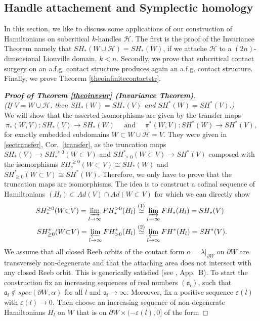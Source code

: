 \documentclass[a4paper,12pt,bibliography=totocnumbered,titlepage=false,abstracton,bookmarksnumbered=true]{scrartcl}
\newcommand{\veps}{\varepsilon}
\theoremstyle{definition}
\begin{document}
\subsection{Handle attachement and Symplectic homology}
In this section, we like to discuss some applications of our construction of Hamiltonians on subcritical $k$-handles $\mathcal{H}$. The first is the proof of the Invariance Theorem namely that $SH_\ast(W{\cup}\mathcal{H})=SH_\ast(W)$, if we attache $\mathcal{H}$ to a $(2n)$-dimensional Liouville domain, $k<n$. Secondly, we prove that subcritical contact surgery on an a.f.g. contact structure produces again an a.f.g. contact structure. Finally, we prove Theorem \ref{theoinfinitecontactstr}.
\begin{proof}[\textnormal{\textbf{Proof of Theorem \ref{theoinvsur} (Invariance Theorem)}}]~\\
\textit{(If $V=W{\cup}\mathcal{H}$, then $SH_\ast(W)=SH_\ast(V)$ and $SH^\ast(W)=SH^\ast(V)$.)}\bigskip\\
We will show that the asserted isomorphisms are given  by the transfer maps
\[\pi_\ast(W,V): SH_\ast(V)\rightarrow SH_\ast(W)\quad\text{ and }\quad \pi^\ast(W,V): SH^\ast(W)\rightarrow SH^\ast(V),\]
for exactly embedded subdomains $W\subset W{\cup}\mathcal{H}= V$. They were given in \ref{sectransfer}, Cor.\ \ref{transfer}, as the truncation maps $SH_\ast(V)\rightarrow SH_\ast^{\geq0}(W{\subset}V)$ and $SH^\ast_{\geq0}(W{\subset}V)\rightarrow SH^\ast(V)$ composed with the isomorphisms $SH_\ast^{\geq0}(W{\subset}V)\cong SH_\ast(W)$ and $SH^\ast_{\geq0}(W{\subset}V)\cong SH^\ast(W)$. Therefore, we only have to prove that the truncation maps are isomorphisms. The idea is to construct a cofinal sequence of Hamiltonians $(H_l)\subset Ad(V)\cap Ad(W{\subset}V)$ for which we can directly show
\begin{equation}\label{proofinvtheo}
 \begin{aligned}
  SH^{\geq0}_\ast(W{\subset}V) = \varinjlim_{l\rightarrow\infty} FH^{>0}_\ast(H_l)&\overset{(1)}{\simeq}\varinjlim_{l\rightarrow\infty} FH_\ast(H_l)=SH_\ast(V)\\
 SH_{\geq0}^\ast(W{\subset}V) = \varprojlim_{l\rightarrow\infty} FH_{>0}^\ast(H_l) &\overset{(2)}{\simeq}\varprojlim_{l\rightarrow\infty} FH^\ast(H_l) = SH^\ast(V).
 \end{aligned}
\end{equation}
We assume that all closed Reeb orbits of the contact form $\alpha=\lambda|_{\partial W}$ on $\partial W$ are transversely non-degenerate and that the attaching area does not intersect with any closed Reeb orbit. This is generically satisfied (see \cite{FraCie}, App.\ B). To start the construction fix an increasing sequences of real numbers $(\mathfrak{a}_l)$, such that $\mathfrak{a}_l\not\in spec(\partial W,\alpha)$ for all $l$ and $\mathfrak{a}_l\rightarrow\infty$. Moreover, fix a positive sequence $\veps(l)$ with $\veps(l)\rightarrow 0$. Then choose an increasing sequence of non-degenerate Hamiltonians $H_l$ on $W$ that is on $\partial W\times (-\veps(l),0]$ of the form

\end{proof}
\end{document}
